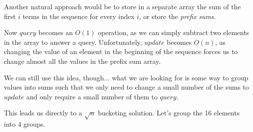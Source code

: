 \documentclass[11pt]{book}
\begin{document}
Another natural approach would be to store in a separate array the sum of the first $i$ terms in the sequence for every index $i$, or store the \textit{prefix sums}.

\begin{center}

\end{center}

Now $query$ becomes an $O(1)$ operation, as we can simply subtract two elements in the array to answer a query. Unfortunately, $update$ becomes $O(n)$, as changing the value of an element in the beginning of the sequence forces us to change almost all the values in the prefix sum array.

We can still use this idea, though... what we are looking for is some way to group values into sums such that we only need to change a small number of the sums to $update$ and only require a small number of them to $query$.

This leads us directly to a $\sqrt{n}$ bucketing solution. Let's group the 16 elements into 4 groups.
\end{document}
